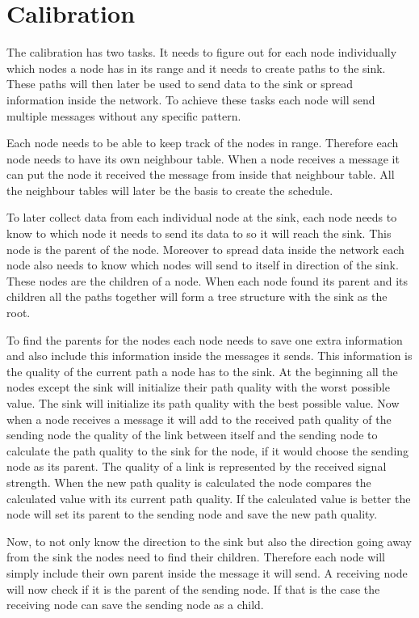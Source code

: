 \section{Calibration}
The calibration has two tasks. It needs to figure out for each node individually which nodes a node has in its range and it needs to create paths to the sink. These paths will then later be used to send data to the sink or spread information inside the network. To achieve these tasks each node will send multiple messages without any specific pattern. 

Each node needs to be able to keep track of the nodes in range. Therefore each node needs to have its own neighbour table. When a node receives a message it can put the node it received the message from inside that neighbour table. All the neighbour tables will later be the basis to create the schedule.

To later collect data from each individual node at the sink, each node needs to know to which node it needs to send its data to so it will reach the sink. This node is the parent of the node. Moreover to spread data inside the network each node also needs to know which nodes will send to itself in direction of the sink. These nodes are the children of a node. When each node found its parent and its children all the paths together will form a tree structure with the sink as the root.

To find the parents for the nodes each node needs to save one extra information and also include this information inside the messages it sends. This information is the quality of the current path a node has to the sink. At the beginning all the nodes except the sink will initialize their path quality with the worst possible value. The sink will initialize its path quality with the best possible value. Now when a node receives a message it will add to the received path quality of the sending node the quality of the link between itself and the sending node to calculate the path quality to the sink for the node, if it would choose the sending node as its parent. The quality of a link is represented by the received signal strength. When the new path quality is calculated the node compares the calculated value with its current path quality. If the calculated value is better the node will set its parent to the sending node and save the new path quality. 

Now, to not only know the direction to the sink but also the direction going away from the sink the nodes need to find their children. Therefore each node will simply include their own parent inside the message it will send. A receiving node will now check if it is the parent of the sending node. If that is the case the receiving node can save the sending node as a child.       

